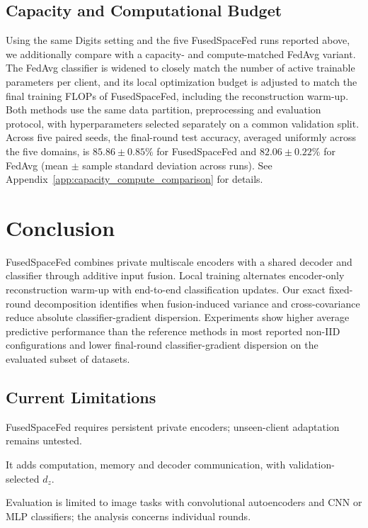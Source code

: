 \documentclass[twoside]{article}
\newcommand{\coauthorcolor}{}
\newenvironment{coauthorrevision}{\par\begingroup\coauthorcolor}{\par\endgroup}
\theoremstyle{thmstyleone}%
\theoremstyle{thmstyletwo}%
\theoremstyle{thmstylethree}%
\begin{document}
\begin{coauthorrevision}
\subsection{Capacity and Computational Budget}
\label{sec:capacity_compute}

Using the same Digits setting and the five FusedSpaceFed runs reported
above, we additionally compare with a capacity- and compute-matched
FedAvg variant. The FedAvg classifier is widened to closely match the
number of active trainable parameters per client, and its local
optimization budget is adjusted to match the final training FLOPs of
FusedSpaceFed, including the reconstruction warm-up. Both methods use
the same data partition, preprocessing and evaluation protocol, with
hyperparameters selected separately on a common validation split.
Across five paired seeds, the final-round test accuracy, averaged
uniformly across the five domains, is $85.86\pm0.85\%$ for FusedSpaceFed
and $82.06\pm0.22\%$ for FedAvg (mean $\pm$ sample standard deviation
across runs). See Appendix~\ref{app:capacity_compute_comparison} for details.
\end{coauthorrevision}

\section{Conclusion}\label{sec:conclusion}

FusedSpaceFed combines private multiscale encoders with a shared decoder and
classifier through additive input fusion. Local training alternates
encoder-only reconstruction warm-up with end-to-end classification updates.
Our exact fixed-round decomposition identifies when fusion-induced variance
and cross-covariance reduce absolute classifier-gradient dispersion.
Experiments show higher average predictive performance than the reference
methods in most reported non-IID configurations and lower final-round
classifier-gradient dispersion on the evaluated subset of datasets.

\subsection{Current Limitations}

FusedSpaceFed requires persistent private encoders; unseen-client adaptation remains untested.

It adds computation, memory and decoder communication, with validation-selected $d_z$.

Evaluation is limited to image tasks with convolutional autoencoders and CNN or MLP classifiers; the analysis concerns individual rounds.
\end{document}
